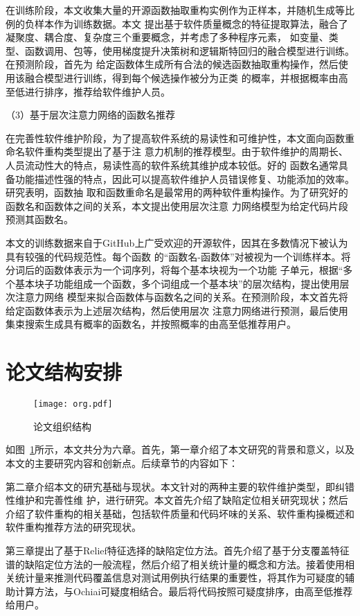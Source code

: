 在训练阶段，本文收集大量的开源函数抽取重构实例作为正样本，并随机生成等比例的负样本作为训练数据。本文
提出基于软件质量概念的特征提取算法，融合了凝聚度、耦合度、复杂度三个重要概念，并考虑了多种程序元素，
如变量、类型、函数调用、包等，使用梯度提升决策树和逻辑斯特回归的融合模型进行训练。在预测阶段，首先为
给定函数体生成所有合法的候选函数抽取重构操作，然后使用该融合模型进行训练，得到每个候选操作被分为正类
的概率，并根据概率由高至低进行排序，推荐给软件维护人员。

（3）基于层次注意力网络的函数名推荐

在完善性软件维护阶段，为了提高软件系统的易读性和可维护性，本文面向函数重命名软件重构类型提出了基于注
意力机制的推荐模型。由于软件维护的周期长、人员流动性大的特点，易读性高的软件系统其维护成本较低。好的
函数名通常具备功能描述性强的特点，因此可以提高软件维护人员错误修复、功能添加的效率。研究表明，函数抽
取和函数重命名是最常用的两种软件重构操作。为了研究好的函数名和函数体之间的关系，本文提出使用层次注意
力网络模型为给定代码片段预测其函数名。

本文的训练数据来自于GitHub上广受欢迎的开源软件，因其在多数情况下被认为具有较强的代码规范性。每个函数
的``函数名-函数体''对被视为一个训练样本。将分词后的函数体表示为一个词序列，将每个基本块视为一个功能
子单元，根据``多个基本块子功能组成一个函数，多个词组成一个基本块''的层次结构，提出使用层次注意力网络
模型来拟合函数体与函数名之间的关系。在预测阶段，本文首先将给定函数体表示为上述层次结构，然后使用层次
注意力网络进行预测，最后使用集束搜索生成具有概率的函数名，并按照概率的由高至低推荐用户。

\section{论文结构安排}
\begin{figure}[htp]
  \centering
  \texttt{[image: org.pdf]}
  \caption{论文组织结构}
  \label{fig:org}
\end{figure}

如图~\ref{fig:org}所示，本文共分为六章。首先，第一章介绍了本文研究的背景和意义，以及本文的主要研究内容和创新点。后续章节的内容如下：  

第二章介绍本文的研宄基础与现状。本文针对的两种主要的软件维护类型，即纠错性维护和完善性维
护，进行研究。本文首先介绍了缺陷定位相关研究现状；然后介绍了软件重构的相关基础，包括软件质量和代码坏味的关系、软件重构操概述和软件重构推荐方法的研究现状。

第三章提出了基于Relief特征选择的缺陷定位方法。首先介绍了基于分支覆盖特征谱的缺陷定位方法的一般流程，然后介绍了相关统计量的概念和方法。接着使用相关统计量来推测代码覆盖信息对测试用例执行结果的重要性，将其作为可疑度的辅助计算方法，与Ochiai可疑度相结合。最后将代码按照可疑度排序，由高至低推荐给用户。

